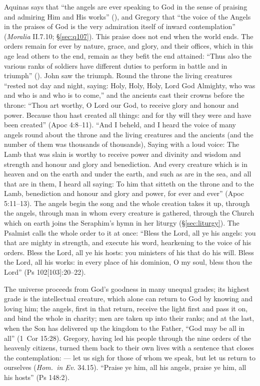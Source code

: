 Aquinas says that ``the angels are ever speaking to God in the sense of
praising and admiring Him and His works'' (), and
Gregory that ``the voice of the Angels in the praises of God is the very
admiration itself of inward contemplation'' (\emph{Moralia} II.7.10;
\S\ref{sec:q107}). This praise does not end when the world ends. The orders
remain for ever by nature, grace, and glory, and their offices, which in
this age lead others to the end, remain as they befit the end attained:
``Thus also the various ranks of soldiers have different duties to perform in
battle and in triumph'' (). John saw the triumph. Round the throne the
living creatures ``rested not day and night, saying: Holy, Holy, Holy, Lord
God Almighty, who was and who is and who is to come,'' and the ancients cast
their crowns before the throne: ``Thou art worthy, O Lord our God, to
receive glory and honour and power. Because thou hast created all things:
and for thy will they were and have been created'' (Apoc 4:8--11). ``And I
beheld, and I heard the voice of many angels round about the throne and the
living creatures and the ancients (and the number of them was thousands of
thousands), Saying with a loud voice: The Lamb that was slain is worthy to
receive power and divinity and wisdom and strength and honour and glory and
benediction. And every creature which is in heaven and on the earth and
under the earth, and such as are in the sea, and all that are in them, I
heard all saying: To him that sitteth on the throne and to the Lamb,
benediction and honour and glory and power, for ever and ever'' (Apoc
5:11--13). The angels begin the song and the whole creation takes it up,
through the angels, through man in whom every creature is gathered, through
the Church which on earth joins the Seraphim's hymn in her liturgy
(\S\ref{sec:liturgy}). The Psalmist calls the whole order to it at once:
``Bless the Lord, all ye his angels: you that are mighty in strength, and
execute his word, hearkening to the voice of his orders. Bless the Lord, all
ye his hosts: you ministers of his that do his will. Bless the Lord, all his
works: in every place of his dominion, O my soul, bless thou the Lord'' (Ps
102[103]:20--22).

The universe
proceeds from God's goodness in many unequal grades; its highest grade is the
intellectual creature, which alone can return to God by knowing and loving
him; the angels, first in that return, receive the light first and pass it
on, and bind the whole in charity; men are taken up into their ranks; and at
the last, when the Son has delivered up the kingdom to the Father, ``God may
be all in all'' (1~Cor 15:28). Gregory, having led his people through the
nine orders of the heavenly citizens, turned them back to their own lives
with a sentence that closes the contemplation:  --- let us sigh for those of
whom we speak, but let us return to ourselves (\emph{Hom.\ in Ev.}
34.15). ``Praise ye him, all his angels, praise ye him, all his hosts''
(Ps 148:2).

